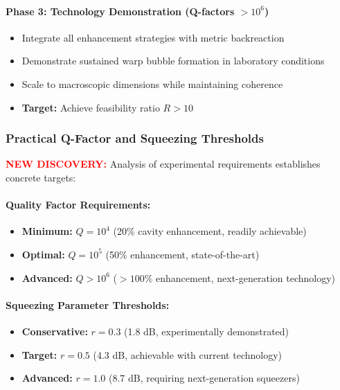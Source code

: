 \documentclass[11pt]{article}
\begin{document}
{\paragraph{Phase 3: Technology Demonstration (Q-factors $> 10^6$)}
\begin{itemize}
  \item Integrate all enhancement strategies with metric backreaction
  \item Demonstrate sustained warp bubble formation in laboratory conditions
  \item Scale to macroscopic dimensions while maintaining coherence
  \item \textbf{Target:} Achieve feasibility ratio $R > 10$
\end{itemize}

\subsubsection*{Practical Q-Factor and Squeezing Thresholds}
\textcolor{red}{\textbf{NEW DISCOVERY:}} Analysis of experimental requirements establishes concrete targets:

\paragraph{Quality Factor Requirements:}
\begin{itemize}
  \item \textbf{Minimum:} $Q = 10^4$ (20\% cavity enhancement, readily achievable)
  \item \textbf{Optimal:} $Q = 10^5$ (50\% enhancement, state-of-the-art)
  \item \textbf{Advanced:} $Q > 10^6$ ($>100\%$ enhancement, next-generation technology)
\end{itemize}

\paragraph{Squeezing Parameter Thresholds:}
\begin{itemize}
  \item \textbf{Conservative:} $r = 0.3$ (1.8 dB, experimentally demonstrated)
  \item \textbf{Target:} $r = 0.5$ (4.3 dB, achievable with current technology)
  \item \textbf{Advanced:} $r = 1.0$ (8.7 dB, requiring next-generation squeezers)
\end{itemize}

}
\end{document}
